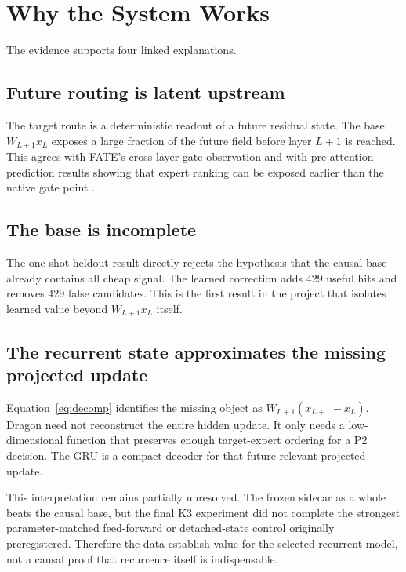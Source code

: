 \documentclass[11pt]{article}
\begin{document}
\section{Why the System Works}

The evidence supports four linked explanations.

\subsection{Future routing is latent upstream}

The target route is a deterministic readout of a future residual state. The base $W_{L+1}x_L$ exposes a large fraction of the future field before layer $L+1$ is reached. This agrees with FATE's cross-layer gate observation \citep{fang2025} and with pre-attention prediction results showing that expert ranking can be exposed earlier than the native gate point \citep{zhu2025}.

\subsection{The base is incomplete}

The one-shot heldout result directly rejects the hypothesis that the causal base already contains all cheap signal. The learned correction adds 429 useful hits and removes 429 false candidates. This is the first result in the project that isolates learned value beyond $W_{L+1}x_L$ itself.

\subsection{The recurrent state approximates the missing projected update}

Equation~\eqref{eq:decomp} identifies the missing object as $W_{L+1}(x_{L+1}-x_L)$. Dragon need not reconstruct the entire hidden update. It only needs a low-dimensional function that preserves enough target-expert ordering for a P2 decision. The GRU is a compact decoder for that future-relevant projected update.

This interpretation remains partially unresolved. The frozen sidecar as a whole beats the causal base, but the final K3 experiment did not complete the strongest parameter-matched feed-forward or detached-state control originally preregistered. Therefore the data establish value for the selected recurrent model, not a causal proof that recurrence itself is indispensable.
\end{document}
